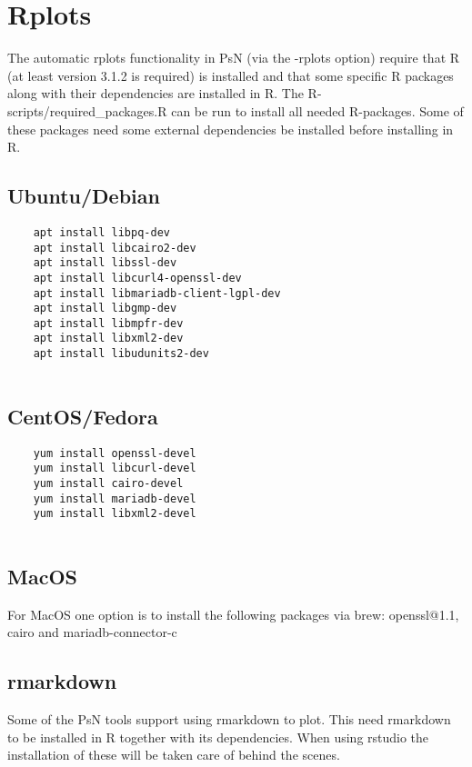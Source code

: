 \section{Rplots}

The automatic rplots functionality in PsN (via the -rplots option) require that R (at least version 3.1.2 is required) is installed and that some specific R packages along with their dependencies are installed in R. The R-scripts/required\_packages.R can be run to install all needed R-packages. Some of these packages need some external dependencies be installed before installing in R.

\subsection{Ubuntu/Debian}
\begin{verbatim}
    apt install libpq-dev
    apt install libcairo2-dev
    apt install libssl-dev
    apt install libcurl4-openssl-dev
    apt install libmariadb-client-lgpl-dev
    apt install libgmp-dev
    apt install libmpfr-dev
    apt install libxml2-dev
    apt install libudunits2-dev
    
\end{verbatim}

\subsection{CentOS/Fedora}
\begin{verbatim}
    yum install openssl-devel
    yum install libcurl-devel
    yum install cairo-devel
    yum install mariadb-devel
    yum install libxml2-devel
    
\end{verbatim}

\subsection{MacOS}
For MacOS one option is to install the following packages via brew: openssl@1.1, cairo and mariadb-connector-c


\subsection{rmarkdown}

Some of the PsN tools support using rmarkdown to plot. This need rmarkdown to be installed in R together with its dependencies. When using rstudio the installation of these will be taken care of behind the scenes.


